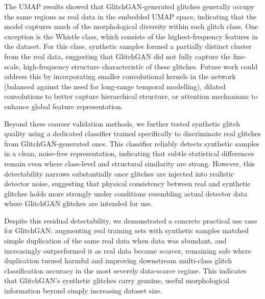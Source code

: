 \documentclass[reprint,nofootinbib,amsmath,amssymb,aps,floatfix]{revtex4-2}
\begin{document}
The UMAP results showed that GlitchGAN-generated glitches generally occupy the same regions as real data in the embedded UMAP space, indicating that the model captures much of the morphological diversity within each glitch class.
One exception is the Whistle class, which consists of the highest-frequency features in the dataset.
For this class, synthetic samples formed a partially distinct cluster from the real data, suggesting that GlitchGAN did not fully capture the fine-scale, high-frequency structure characteristic of these glitches.
Future work could address this by incorporating smaller convolutional kernels in the network (balanced against the need for long-range temporal modelling), dilated convolutions to better capture hierarchical structure, or attention mechanisms to enhance global feature representation.

Beyond these coarser validation methods, we further tested synthetic glitch quality using a dedicated classifier trained specifically to discriminate real glitches from GlitchGAN-generated ones. This classifier reliably detects synthetic samples in a clean, noise-free representation, indicating that subtle statistical differences remain even where class-level and structural similarity are strong. However, this detectability narrows substantially once glitches are injected into realistic detector noise, suggesting that physical consistency between real and synthetic glitches holds more strongly under conditions resembling actual detector data where GlitchGAN glitches are intended for use.

Despite this residual detectability, we demonstrated a concrete practical use case for GlitchGAN: augmenting real training sets with synthetic samples matched simple duplication of the same real data when data was abundant, and increasingly outperformed it as real data became scarcer, remaining safe where duplication turned harmful and improving downstream multi-class glitch classification accuracy in the most severely data-scarce regime. 
This indicates that GlitchGAN's synthetic glitches carry genuine, useful morphological information beyond simply increasing dataset size.
\end{document}
